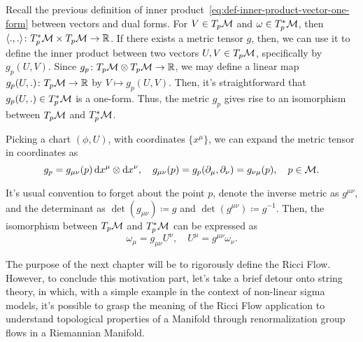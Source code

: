 Recall the previous definition of inner product~\eqref{eq:def-inner-product-vector-one-form} between vectors and dual forms. For $V \in T_p \mathcal{M}$ and $\omega \in T^*_p \mathcal{M}$, then $\langle ., . \rangle \colon T^*_p \mathcal{M} \times T_p \mathcal{M} \to \mathbb{R}$. If there exists a metric tensor $g$, then, we can use it to define the inner product between two vectors $U,V \in T_p \mathcal{M}$, specifically by $g_p(U,V)$. Since $g_p \colon T_p \mathcal{M} \otimes T_p \mathcal{M} \to \mathbb{R}$, we may define a linear map $g_p(U,.) \colon T_p \mathcal{M} \to \mathbb{R}$ by $V \mapsto g_p(U,V)$. Then, it's straightforward that $g_p(U,.) \in T^*_p \mathcal{M}$ is a one-form. Thus, the metric $g_p$ gives rise to an isomorphism between $T_p \mathcal{M}$ and $T^*_p \mathcal{M}$.

Picking a chart $(\phi,U)$, with coordinates $\{ x^\mu \}$, we can expand the metric tensor in coordinates as
\begin{equation}
    g_p = g_{\mu\nu}(p) \mathop{}\!\mathrm{d} x^\mu \otimes \mathop{}\!\mathrm{d} x^\nu, \quad g_{\mu\nu}(p) = g_p (\partial_\mu, \partial_\nu) = g_{\nu\mu}(p), \quad p \in \mathcal{M}.
\end{equation}

It's usual convention to forget about the point $p$, denote the inverse metric as $g^{\mu\nu}$, and the determinant as $\det(g_{\mu\nu}) \coloneq g$ and $\det(g^{\mu\nu}) \coloneq g^{-1}$. Then, the isomorphism between $T_p \mathcal{M}$ and $T^*_p \mathcal{M}$ can be expressed as
\begin{equation}
    \omega_\mu = g_{\mu\nu} U^\nu, \quad U^\mu = g^{\mu\nu} \omega_\nu .
\end{equation}

The purpose of the next chapter will be to rigorously define the Ricci Flow. However, to conclude this motivation part, let's take a brief detour onto string theory, in which, with a simple example in the context of non-linear sigma models, it's possible to grasp the meaning of the Ricci Flow application to understand topological properties of a Manifold through renormalization group flows in a Riemannian Manifold.